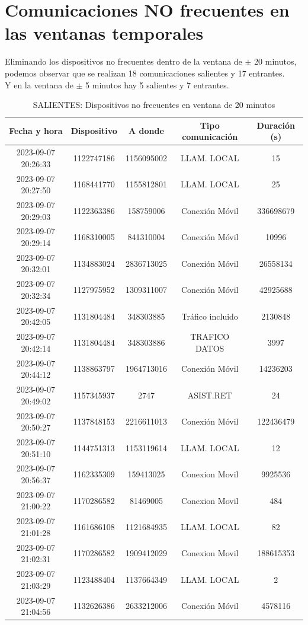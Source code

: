 \documentclass[12pt]{report}
\begin{document}
	\section*{Comunicaciones NO frecuentes en las ventanas temporales}
	Eliminando los dispositivos no frecuentes dentro de la ventana de $\pm$ 20 minutos, podemos observar que se realizan 18 comunicaciones salientes y 17 entrantes.\\
	Y en la ventana de $\pm$ 5 minutos hay 5 salientes y 7 entrantes.\\
	\begin{table}[h]
		\centering
		\begin{tabular}{|c|c|c|c|c|}
			\hline
			Fecha y hora & Dispositivo & A donde &  Tipo comunicación & Duración (s)  \\
			\hline
			2023-09-07 20:26:33 & 1122747186 & 1156095002 & LLAM. LOCAL & 15\\
			2023-09-07 20:27:50 & 1168441770 & 1155812801 & LLAM. LOCAL & 25\\
			2023-09-07 20:29:03 & 1122363386 & 158759006 & Conexión Móvil & 336698679\\
			2023-09-07 20:29:14 & 1168310005 & 841310004 & Conexión Móvil & 10996\\
			2023-09-07 20:32:01 & 1134883024 & 2836713025 & Conexión Móvil & 26558134\\
			2023-09-07 20:32:34 & 1127975952 & 1309311007 & Conexión Móvil & 42925688\\
			2023-09-07 20:42:05 & 1131804484 & 348303885 & Tráfico incluido & 2130848\\
			2023-09-07 20:42:14 & 1131804484 & 348303886 & TRAFICO DATOS & 3997\\
			2023-09-07 20:44:12 & 1138863797 & 1964713016 & Conexión Móvil & 14236203\\
			2023-09-07 20:49:02 & 1157345937 & 2747 & ASIST.RET & 24\\
			2023-09-07 20:50:27 & 1137848153 & 2216611013 & Conexión Móvil & 122436479\\
			2023-09-07 20:51:10 & 1144751313 & 1153119614 & LLAM. LOCAL & 12\\
			2023-09-07 20:56:37 & 1162335309 & 159413025 & Conexion Movil & 9925536\\
			2023-09-07 21:00:22 & 1170286582 & 81469005 & Conexion Movil & 484\\
			2023-09-07 21:01:28 & 1161686108 & 1121684935 & LLAM. LOCAL & 82\\
			2023-09-07 21:02:31 & 1170286582 & 1909412029 & Conexion Movil & 188615353\\
			2023-09-07 21:03:29 & 1123488404 & 1137664349 & LLAM. LOCAL & 2\\
			2023-09-07 21:04:56 & 1132626386 & 2633212006 & Conexión Móvil & 4578116\\
			\hline
		\end{tabular}
		\caption{SALIENTES: Dispositivos no frecuentes en ventana de 20 minutos}
		\label{tab:t3}
	\end{table}
\end{document}
